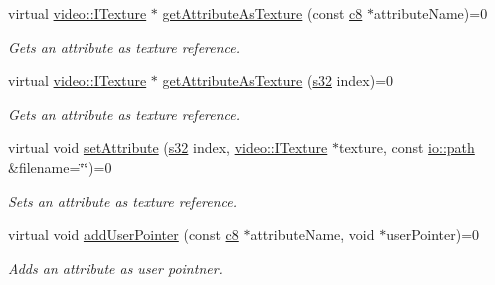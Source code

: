 \begin{DoxyCompactItemize}
virtual \hyperlink{classirr_1_1video_1_1ITexture}{video\+::\+I\+Texture} $\ast$ \hyperlink{classirr_1_1io_1_1IAttributes_a2044beb7dcf310beb95ed0f4008f2b27}{get\+Attribute\+As\+Texture} (const \hyperlink{namespaceirr_a9395eaea339bcb546b319e9c96bf7410}{c8} $\ast$attribute\+Name)=0
\begin{DoxyCompactList}\small\item\em Gets an attribute as texture reference. \end{DoxyCompactList}\item 
virtual \hyperlink{classirr_1_1video_1_1ITexture}{video\+::\+I\+Texture} $\ast$ \hyperlink{classirr_1_1io_1_1IAttributes_ad022db880ccf7844c720efceef7c22fc}{get\+Attribute\+As\+Texture} (\hyperlink{namespaceirr_ac66849b7a6ed16e30ebede579f9b47c6}{s32} index)=0
\begin{DoxyCompactList}\small\item\em Gets an attribute as texture reference. \end{DoxyCompactList}\item 
\mbox{\label{classirr_1_1io_1_1IAttributes_a31db1888f86c81f35caab8414ef8dcfc}} 
virtual void \hyperlink{classirr_1_1io_1_1IAttributes_a31db1888f86c81f35caab8414ef8dcfc}{set\+Attribute} (\hyperlink{namespaceirr_ac66849b7a6ed16e30ebede579f9b47c6}{s32} index, \hyperlink{classirr_1_1video_1_1ITexture}{video\+::\+I\+Texture} $\ast$texture, const \hyperlink{namespaceirr_1_1io_ab1bdc45edb3f94d8319c02bc0f840ee1}{io\+::path} \&filename=\char`\"{}\char`\"{})=0
\begin{DoxyCompactList}\small\item\em Sets an attribute as texture reference. \end{DoxyCompactList}\item 
\mbox{\label{classirr_1_1io_1_1IAttributes_a04717eae75a539cd87ea057bf0444db2}} 
virtual void \hyperlink{classirr_1_1io_1_1IAttributes_a04717eae75a539cd87ea057bf0444db2}{add\+User\+Pointer} (const \hyperlink{namespaceirr_a9395eaea339bcb546b319e9c96bf7410}{c8} $\ast$attribute\+Name, void $\ast$user\+Pointer)=0
\begin{DoxyCompactList}\small\item\em Adds an attribute as user pointner. \end{DoxyCompactList}\item 
\mbox{\label{classirr_1_1io_1_1IAttributes_a558e6bb8c92226e99cd5b858db1b3ea8}} 

\end{DoxyCompactItemize}
